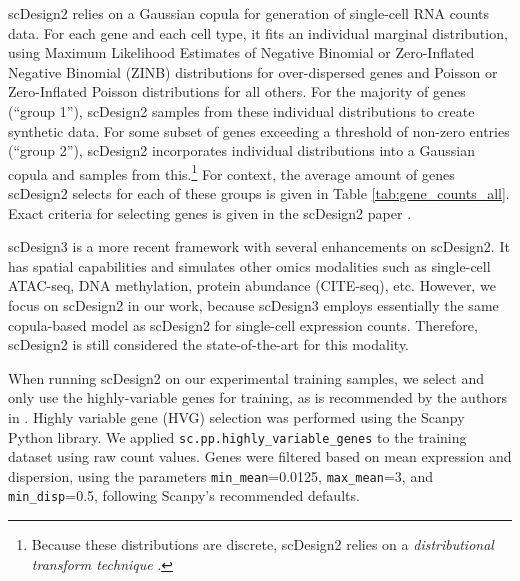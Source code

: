\documentclass[unnumsec,webpdf,contemporary,large]{oup-authoring-template}%
\theoremstyle{thmstyleone}%
\theoremstyle{thmstyletwo}%
\theoremstyle{thmstylethree}%
\begin{document}
scDesign2 \cite{sun2021scdesign2} relies on a Gaussian copula for generation of single-cell RNA counts data. For each gene and each cell type, it fits an individual marginal distribution, using Maximum Likelihood Estimates of Negative Binomial or Zero-Inflated Negative Binomial (ZINB) distributions for over-dispersed genes and Poisson or Zero-Inflated Poisson distributions for all others.
For the majority of genes (``group 1''), scDesign2 samples from these individual distributions to create synthetic data. For some subset of genes exceeding a threshold of non-zero entries (``group 2''), scDesign2 incorporates individual distributions into a Gaussian copula and samples from this.\footnote{Because these distributions are discrete, scDesign2 relies on a \textit{distributional transform technique} \cite{copulaDistTransform}.} For context, the average amount of genes scDesign2 selects for each of these groups is given in Table \ref{tab:gene_counts_all}. Exact criteria for selecting genes is given in the scDesign2 paper \citep{sun2021scdesign2}. 

scDesign3 \cite{sun2023scdesign3} is a more recent framework with several enhancements on scDesign2. It has spatial capabilities and simulates other omics modalities such as single-cell ATAC-seq, DNA methylation, protein abundance (CITE-seq), etc. However, we focus on scDesign2 in our work, because scDesign3 employs essentially the same copula-based model as scDesign2 for single-cell expression counts. Therefore, scDesign2 is still considered the state-of-the-art for this modality.

When running scDesign2 on our experimental training samples, we select and only use the highly-variable genes for training, as is recommended by the authors in \cite{sun2021scdesign2}. 
Highly variable gene (HVG) selection was performed using the Scanpy Python library. 
We applied \texttt{sc.pp.highly\_variable\_genes} to the training dataset using raw count values. 
Genes were filtered based on mean expression and dispersion, using the parameters \texttt{min\_mean}=0.0125, \texttt{max\_mean}=3, and \texttt{min\_disp}=0.5, following Scanpy's recommended defaults.
\end{document}
